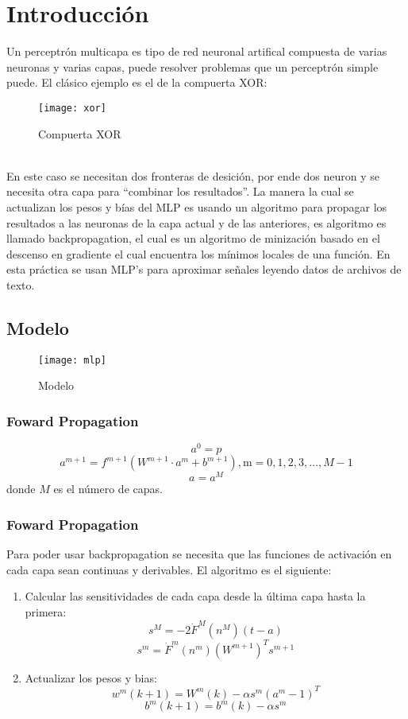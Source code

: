 \documentclass{article}
\begin{document}
\maketitle
\tableofcontents
\section{Introducción}
Un perceptrón multicapa es tipo de red neuronal artifical compuesta de varias neuronas y varias capas, puede resolver problemas que un perceptrón simple puede. El clásico ejemplo es el de la compuerta XOR:
\begin{figure}[h!]
	\caption{Compuerta XOR}
	\centering
	\texttt{[image: xor]}
\end{figure}
\\
En este caso se necesitan dos fronteras de desición, por ende dos neuron y se necesita otra capa para ``combinar los resultados''. La manera la cual se actualizan los pesos y bías del MLP es usando un algoritmo para propagar los resultados a las neuronas de la capa actual y de las anteriores, es algoritmo es llamado backpropagation, el cual es un algoritmo de minización basado en el descenso en gradiente el cual encuentra los mínimos locales de una función. En esta práctica se usan MLP's para aproximar señales leyendo datos de archivos de texto.
\newpage
\subsection{Modelo}
\begin{figure}[h!]
	\caption{Modelo}
	\centering
	\texttt{[image: mlp]}
\end{figure}
\subsubsection{Foward Propagation}
$$ a^0 = p$$
$$ a^{m+1} = f^{m+1}(W^{m+1} \cdot a^m + b^{m+1}), \text{m}=0,1,2,3,\dots,M-1$$
$$ a=a^M $$
donde $M$ es el número de capas.\\
\subsubsection{Foward Propagation}
Para poder usar backpropagation se necesita que las funciones de activación en cada capa sean continuas y derivables.
El algoritmo es el siguiente:
\begin{enumerate}
	\item Calcular las sensitividades de cada capa desde la última capa hasta la primera: 
	$$ s^M = -2\dot{F}^M(n^M)(t-a)$$
	$$ s^m = \dot{F}^m(n^m)(W^{m + 1})^T s^{m+1} $$
	\item Actualizar los pesos y bias:
	$$ w^{m}(k+1) = W^m(k)-\alpha s^m(a^m-1)^T $$
	$$ b^{m}(k+1) = b^m(k)-\alpha s^m $$	
\end{enumerate}
\end{document}
